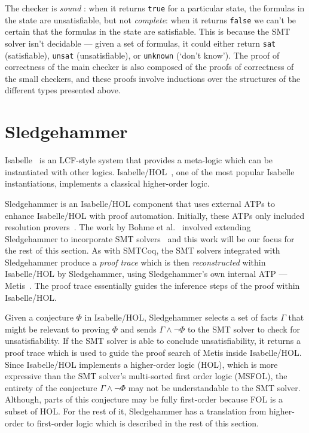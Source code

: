 \documentclass{article}
\begin{document}
	The checker is \textit{sound} : 
	when it returns \texttt{true} for 
	a particular state, the formulas 
	in the state are unsatisfiable, but 
	not \textit{complete}: when it 
	returns \texttt{false} we can't be 
	certain that the formulas in the 
	state are satisfiable. This is 
	because the SMT solver isn't 
	decidable --- given a set of 
	formulas, it could either 
	return \texttt{sat} (satisfiable), 
	\texttt{unsat} (unsatisfiable), or 
	\texttt{unknown} (`don't know').
	The proof of correctness of the main 
	checker is also composed of the 
	proofs of correctness of the small 
	checkers, and these proofs involve 
	inductions over the structures of 
	the different types presented 
	above. 

	
\section{Sledgehammer}
\label{sec:hammer}
	Isabelle~\cite{DBLP:journals/corr/cs-LO-9301106} 
	is an LCF-style system that 
	provides a meta-logic which can be 
	instantiated with other logics.
	Isabelle/HOL~\cite{10.5555/1791547}, 
	one of the most popular Isabelle 
	instantiations, implements a 
	classical higher-order logic. 
	
	Sledgehammer is
	an Isabelle/HOL component that 
	uses external ATPs to enhance 
	Isabelle/HOL with proof 
	automation. Initially, these 
	ATPs only included resolution 
	provers~\cite{10.1007/978-3-642-39799-8_1}.
	The work by Bohme et 
	al.~\cite{bohme} involved 
	extending Sledgehammer to 
	incorporate SMT
	solvers~\cite{Barrett2018} and this 
	work will be our focus for the 
	rest of this section. As with 
	SMTCoq, the SMT solvers integrated
	with Sledgehammer produce a 
	\textit{proof trace} which is 
	then \textit{reconstructed} within
	Isabelle/HOL by Sledgehammer, 
	using Sledgehammer's own internal 
	ATP --- Metis~\cite{hurd2003d}. The 
	proof trace essentially guides 
	the inference steps of the proof 
	within Isabelle/HOL.
	
	Given a conjecture $\Phi$ in 
	Isabelle/HOL, Sledgehammer 
	selects a set of facts 
	$\Gamma$ that might be relevant 
	to proving $\Phi$ and sends 
	$\Gamma \land \neg \Phi$ to the 
	SMT solver to check for 
	unsatisfiability. If the SMT 
	solver is able to conclude 
	unsatisfiability, it returns 
	a proof trace which is 
	used to guide the proof search 
	of Metis inside Isabelle/HOL.
	Since Isabelle/HOL implements 
	a higher-order logic (HOL), which 
	is more expressive than 
	the SMT solver's multi-sorted
	first order logic (MSFOL),
	the entirety of the conjecture
	$\Gamma \land \neg \Phi$ may not 
	be understandable to the SMT 
	solver. Although, parts of 
	this conjecture may be fully 
	first-order because FOL is 
	a subset of HOL. For the 
	rest of it, Sledgehammer
	has a translation from 
	higher-order to first-order
	logic which is described 
	in the rest of this section.
	
\end{document}
